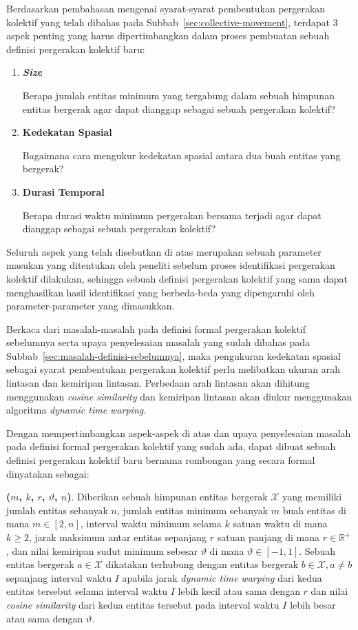 Berdasarkan pembahasan mengenai syarat-syarat pembentukan pergerakan kolektif yang telah dibahas pada Subbab~\ref{sec:collective-movement}, terdapat 3 aspek penting yang harus dipertimbangkan dalam proses pembuatan sebuah definisi pergerakan kolektif baru:

\begin{enumerate}
    \item \textbf{\textit{Size}}
    
    Berapa jumlah entitas minimum yang tergabung dalam sebuah himpunan entitas bergerak agar dapat dianggap sebagai sebuah pergerakan kolektif?
    
    \item \textbf{Kedekatan Spasial}
    
    Bagaimana cara mengukur kedekatan spasial antara dua buah entitas yang bergerak?
    
    \item \textbf{Durasi Temporal}
    
    Berapa durasi waktu minimum pergerakan bersama terjadi agar dapat dianggap sebagai sebuah pergerakan kolektif?
\end{enumerate}

Seluruh aspek yang telah disebutkan di atas merupakan sebuah parameter masukan yang ditentukan oleh peneliti sebelum proses identifikasi pergerakan kolektif dilakukan, sehingga sebuah definisi pergerakan kolektif yang sama dapat menghasilkan hasil identifikasi yang berbeda-beda yang dipengaruhi oleh parameter-parameter yang dimasukkan.

Berkaca dari masalah-masalah pada definisi formal pergerakan kolektif sebelumnya serta upaya penyelesaian masalah yang sudah dibahas pada Subbab~\ref{sec:masalah-definisi-sebelumnya}, maka pengukuran kedekatan spasial sebagai syarat pembentukan pergerakan kolektif perlu melibatkan ukuran arah lintasan dan kemiripan lintasan. Perbedaan arah lintasan akan dihitung menggunakan \textit{cosine similarity} dan kemiripan lintasan akan diukur menggunakan algoritma \textit{dynamic time warping}.

Dengan mempertimbangkan aspek-aspek di atas dan upaya penyelesaian masalah pada definisi formal pergerakan kolektif yang sudah ada, dapat dibuat sebuah definisi pergerakan kolektif baru bernama rombongan yang secara formal dinyatakan sebagai:

\noindent \textbf{\pergerakankolektif($m$, $k$, $r$, $\vartheta$, $n$)}. Diberikan sebuah himpunan entitas bergerak $\mathcal{X}$ yang memiliki jumlah entitas sebanyak $n$, jumlah entitas minimum sebanyak $m$ buah entitas di mana $m \in [2, n]$, interval waktu minimum selama $k$ satuan waktu di mana $k \geq 2$, jarak maksimum antar entitas sepanjang $r$ satuan panjang di mana $r \in \mathbb{R}^+$, dan nilai kemiripan sudut minimum sebesar $\vartheta$ di mana $\vartheta \in [-1, 1]$. Sebuah entitas bergerak $a \in \mathcal{X}$ dikatakan terhubung dengan entitas bergerak $b \in \mathcal{X}, a \neq b$ sepanjang interval waktu $I$ apabila jarak \textit{dynamic time warping} dari kedua entitas tersebut selama interval waktu $I$ lebih kecil atau sama dengan $r$ dan nilai \textit{cosine similarity} dari kedua entitas tersebut pada interval waktu $I$ lebih besar atau sama dengan $\vartheta$.

